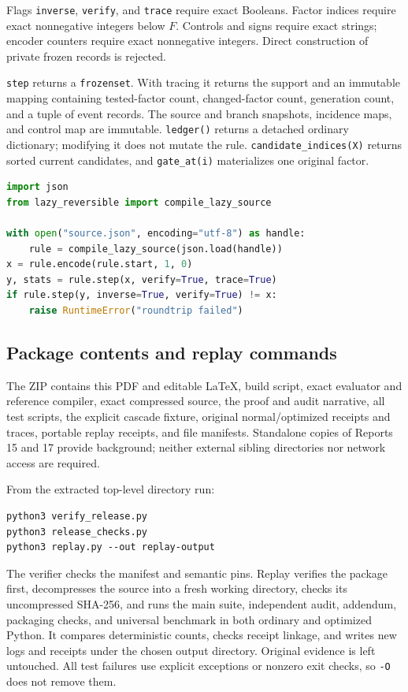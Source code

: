 \documentclass[11pt,a4paper]{article}
\numberwithin{equation}{section}
\begin{document}
Flags \texttt{inverse}, \texttt{verify}, and \texttt{trace} require exact Booleans. Factor indices require exact nonnegative integers below $F$. Controls and signs require exact strings; encoder counters require exact nonnegative integers. Direct construction of private frozen records is rejected.

\texttt{step} returns a \texttt{frozenset}. With tracing it returns the support and an immutable mapping containing tested-factor count, changed-factor count, generation count, and a tuple of event records. The source and branch snapshots, incidence maps, and control map are immutable. \texttt{ledger()} returns a detached ordinary dictionary; modifying it does not mutate the rule. \texttt{candidate\_indices(X)} returns sorted current candidates, and \texttt{gate\_at(i)} materializes one original factor.

\begin{lstlisting}[language=Python]
import json
from lazy_reversible import compile_lazy_source

with open("source.json", encoding="utf-8") as handle:
    rule = compile_lazy_source(json.load(handle))
x = rule.encode(rule.start, 1, 0)
y, stats = rule.step(x, verify=True, trace=True)
if rule.step(y, inverse=True, verify=True) != x:
    raise RuntimeError("roundtrip failed")
\end{lstlisting}

\subsection{Package contents and replay commands}
The ZIP contains this PDF and editable LaTeX, build script, exact evaluator and reference compiler, exact compressed source, the proof and audit narrative, all test scripts, the explicit cascade fixture, original normal/optimized receipts and traces, portable replay receipts, and file manifests. Standalone copies of Reports 15 and 17 provide background; neither external sibling directories nor network access are required.

From the extracted top-level directory run:
\begin{lstlisting}
python3 verify_release.py
python3 release_checks.py
python3 replay.py --out replay-output
\end{lstlisting}
The verifier checks the manifest and semantic pins. Replay verifies the package first, decompresses the source into a fresh working directory, checks its uncompressed SHA-256, and runs the main suite, independent audit, addendum, packaging checks, and universal benchmark in both ordinary and optimized Python. It compares deterministic counts, checks receipt linkage, and writes new logs and receipts under the chosen output directory. Original evidence is left untouched. All test failures use explicit exceptions or nonzero exit checks, so \texttt{-O} does not remove them.
\end{document}
